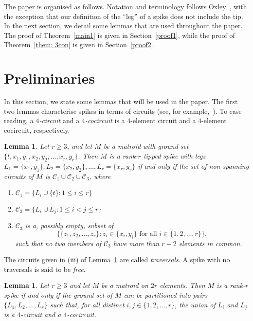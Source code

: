 \documentclass[11pt]{amsart}
\newtheorem{lemma}[theorem]{Lemma}
\numberwithin{equation}{section} %
\newcommand{\cC}{\mathcal{C}}
\begin{document}
The paper is organised as follows. Notation and terminology follows Oxley~\cite{ox11}, with the exception that our definition of the ``leg'' of a spike does not include the tip. In the next section, we detail some lemmas that are used throughout the paper. The proof of Theorem~\ref{main1} is given in Section~\ref{proof1}, while the proof of Theorem~\ref{them: 3con} is given in Section~\ref{proof2}.

\section{Preliminaries}

In this section, we state some lemmas that will be used in the paper. The first two lemmas characterise spikes in terms of circuits (see, for example,~\cite{ox11}). To ease reading, a {\em $4$-circuit} and a {\em $4$-cocircuit} is a $4$-element circuit and a $4$-element cocircuit, respectively.

\begin{lemma}
Let $r\ge 3$, and let $M$ be a matroid with ground set $\{t, x_1, y_1, x_2, y_2, \ldots, x_r, y_r\}$. Then $M$ is a rank-$r$ tipped spike with legs $L_1=\{x_1, y_1\}, L_2=\{x_2, y_2\}, \ldots, L_r=\{x_r, y_r\}$ if and only if the set of non-spanning circuits of $M$ is $\cC_1 \cup \cC_2 \cup \cC_3$, where
\begin{enumerate}[{\rm (i)}]
\item $\cC_1 = \{L_i\cup \{t\}: 1\le i\le r\}$

\item $\cC_2 = \{L_i\cup L_j: 1\le i < j\le r\}$

\item $\cC_3$ is a, possibly empty, subset of
$$\big\{\{z_1, z_2, \ldots, z_r\}: \mbox{$z_i\in \{x_i, y_i\}$ for all $i\in \{1, 2, \ldots, r\}$}\big\},$$
such that no two members of $\cC_3$ have more than $r-2$ elements in common.
\end{enumerate}
\label{circuits}
\end{lemma}

\noindent The circuits given in (iii) of Lemma~\ref{circuits} are called {\em traversals}. A spike with no traversals is said to be {\em free}.

\begin{lemma}
Let $r\ge 3$ and let $M$ be a matroid on $2r$ elements. Then $M$ is a rank-$r$ spike if and only if the ground set of $M$ can be partitioned into pairs $\{L_1, L_2, \ldots, L_r\}$ such that, for all distinct $i, j\in \{1, 2, \ldots, r\}$, the union of $L_i$ and $L_j$ is a $4$-circuit and a $4$-cocircuit.
\label{pairs}
\end{lemma}
\end{document}
